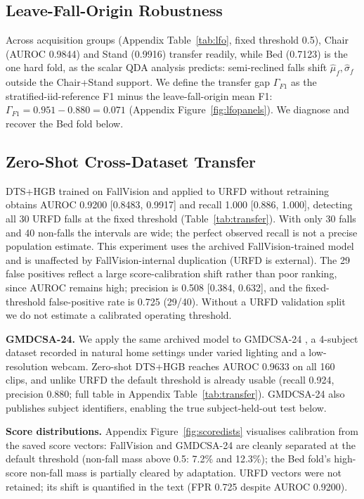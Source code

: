 \subsection{Leave-Fall-Origin Robustness}
Across acquisition groups (Appendix Table~\ref{tab:lfo}, fixed threshold 0.5), Chair (AUROC 0.9844) and Stand (0.9916) transfer readily, while Bed (0.7123) is the one hard fold, as the scalar QDA analysis predicts: semi-reclined falls shift $\hat\mu_f,\hat\sigma_f$ outside the Chair+Stand support. We define the transfer gap $\Gamma_{F1}$ as the stratified-iid-reference F1 minus the leave-fall-origin mean F1: $\Gamma_{F1}=0.951-0.880=0.071$ (Appendix Figure~\ref{fig:lfopanels}). We diagnose and recover the Bed fold below.

\subsection{Zero-Shot Cross-Dataset Transfer}
DTS+HGB trained on FallVision and applied to URFD without retraining obtains AUROC 0.9200 [0.8483, 0.9917] and recall 1.000 [0.886, 1.000], detecting all 30 URFD falls at the fixed threshold (Table~\ref{tab:transfer}). With only 30 falls and 40 non-falls the intervals are wide; the perfect observed recall is not a precise population estimate. This experiment uses the archived FallVision-trained model and is unaffected by FallVision-internal duplication (URFD is external). The 29 false positives reflect a large score-calibration shift rather than poor ranking, since AUROC remains high; precision is 0.508 [0.384, 0.632], and the fixed-threshold false-positive rate is 0.725 (29/40). Without a URFD validation split we do not estimate a calibrated operating threshold.

\textbf{GMDCSA-24.} We apply the same archived model to GMDCSA-24 \citep{alam2024gmdcsa}, a 4-subject dataset recorded in natural home settings under varied lighting and a low-resolution webcam. Zero-shot DTS+HGB reaches AUROC 0.9633 on all 160 clips, and unlike URFD the default threshold is already usable (recall 0.924, precision 0.880; full table in Appendix Table~\ref{tab:transfer}). GMDCSA-24 also publishes subject identifiers, enabling the true subject-held-out test below.

\textbf{Score distributions.} Appendix Figure~\ref{fig:scoredists} visualises calibration from the saved score vectors: FallVision and GMDCSA-24 are cleanly separated at the default threshold (non-fall mass above 0.5: 7.2\% and 12.3\%); the Bed fold's high-score non-fall mass is partially cleared by adaptation. URFD vectors were not retained; its shift is quantified in the text (FPR 0.725 despite AUROC 0.9200).

